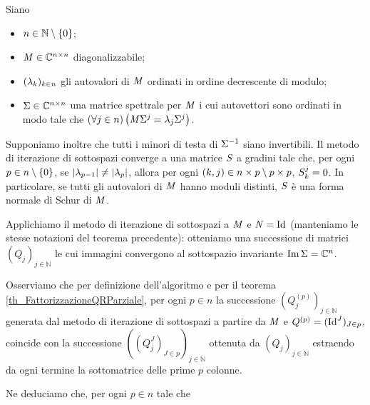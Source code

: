 \begin{Corollary}
  Siano
  \begin{itemize}
    \item $n \in \mathbb{N} \setminus \lbrace 0 \rbrace$;
    \item $\mathit{M} \in \mathbb{C}^{n \times n}$ diagonalizzabile;
    \item $(\lambda_k)_{k \in n}$ gli autovalori di $\mathit{M}$ ordinati in ordine
      decrescente di modulo;
    \item $\Sigma \in \mathbb{C}^{n \times n}$ una matrice spettrale
      per $\mathit{M}$ i cui autovettori sono ordinati in modo tale che
      $\left ( \forall j \in n \right ) \left ( \mathit{M} \Sigma^j = \lambda_j \Sigma^j \right )$.
  \end{itemize}
  Supponiamo inoltre che tutti i minori di testa di
  $\Sigma^{-1}$
  siano invertibili.
  Il metodo di iterazione di sottospazi converge a una matrice
  $S$ 
  a gradini tale che, per ogni $p \in n \setminus \lbrace 0 \rbrace$, se
  $\left \lvert \lambda_{p - 1} \right \rvert \neq \left \lvert \lambda_p \right \rvert$,
  allora per ogni $(k,j) \in n \times p \setminus p \times p$,
  $S_k^j = 0$.
  In particolare, se tutti gli autovalori di $\mathit{M}$ hanno moduli distinti,
  $S$ \`e una forma normale di Schur di $\mathit{M}$.
\end{Corollary}
\begin{listing}
	\caption{Implementazione del metodo di iterazioni di sottospazi 
    per il calcolo di una forma normale di Schur in .}
\end{listing}
\Proof Applichiamo il metodo di iterazione di sottospazi a $\mathit{M}$ e
$\VarMatrix = \Identity$ (manteniamo le stesse notazioni del teorema
precedente): otteniamo una successione di matrici
$(Q_j)_{j \in \mathbb{N}}$
le cui immagini convergono al sottospazio invariante
$\operatorname{Im}{\Sigma} = \mathbb{C}^n$.
\par Osserviamo che per definizione dell'algoritmo e
per il teorema \ref{th_FattorizzazioneQRParziale}, per ogni
$p \in n$ la successione
$(Q^{(p)}_j)_{j \in \mathbb{N}}$
generata dal metodo di iterazione di sottospazi a partire da $\mathit{M}$ e
$Q^{(p)} = (\Identity^J)_{J \in p}$, coincide con la successione
$((Q^J_j)_{J \in p})_{j \in \mathbb{N}}$ ottenuta da
$(Q_j)_{j \in \mathbb{N}}$ estraendo da ogni termine
la sottomatrice delle prime $p$ colonne.
\par Ne deduciamo che, per ogni $p \in n$ tale che
